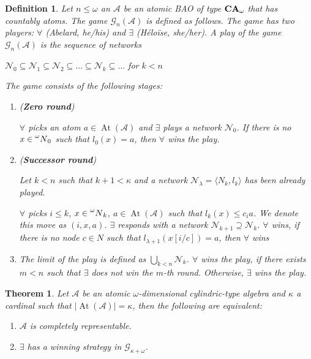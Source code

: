 \documentclass[a4paper]{article}
\theoremstyle{defin}
\newtheorem{defin}{Definition}
\theoremstyle{theorem}
\newtheorem{theorem}{Theorem}
\theoremstyle{prop}
\theoremstyle{lemma}
\theoremstyle{fact}
\theoremstyle{ex}
\theoremstyle{col}
\begin{document}
\begin{defin} Let $n \leq \omega$ an $\mathcal{A}$ be an atomic BAO of type ${\bf CA}_{\omega}$ that has countably atoms. The game $\mathcal{G}_{n}(\mathcal{A})$ is defined as follows. The game has two players: $\forall$ (Abelard, he/his) and $\exists$ (H\'{e}lo\"{i}se, she/her). A play of the game $\mathcal{G}_{n}(\mathcal{A})$ is the sequence of networks
  \begin{center}
    $\mathcal{N}_0 \subseteq \mathcal{N}_1 \subseteq \mathcal{N}_2 \subseteq \dots \subseteq \mathcal{N}_{k} \subseteq \dots$ for $k < n$
  \end{center}
  The game consists of the following stages:
  \begin{enumerate}
    \item ({\bf Zero round})

    $\forall$ picks an atom $a \in \operatorname{At}(\mathcal{A})$ and $\exists$ plays a network $\mathcal{N}_0$. If there is no $x \in \prescript{\omega}{}N_0$ such that $l_0(x) = a$, then $\forall$ wins the play.
    \item ({\bf Successor round})

    Let $k < n$ such that $k + 1 < \kappa$ and a network $\mathcal{N}_{\lambda} = \langle N_{k}, l_{k} \rangle$ has been already played.

    $\forall$ picks $i \leq k$, $x \in \prescript{\omega}{}N_{k}$, $a \in \operatorname{At}(\mathcal{A})$ such that $l_{k}(x) \leq c_i a$.
    We denote this move as $(i, x, a)$. $\exists$ responds with a network $\mathcal{N}_{k + 1} \supseteq \mathcal{N}_{k}$. $\forall$ wins, if there is no node $c \in N$ such that $l_{\lambda+1}(x[i/c]) = a$, then $\forall$ wins
    \item The limit of the play is defined as $\bigcup \limits_{k < n} \mathcal{N}_{k}$. $\forall$ wins the play, if there exists $m < n$ such that $\exists$ does not win the $m$-th round. Otherwise, $\exists$ wins the play.
  \end{enumerate}
\end{defin}

\begin{theorem}
  Let $\mathcal{A}$ be an atomic $\omega$-dimensional cylindric-type algebra and $\kappa$ a cardinal such that $|\operatorname{At}(\mathcal{A})| = \kappa$, then the following are equivalent:

  \begin{enumerate}
    \item $\mathcal{A}$ is completely representable.
    \item $\exists$ has a winning strategy in $\mathcal{G}_{\kappa + \omega}$.
  \end{enumerate}
\end{theorem}
\end{document}
